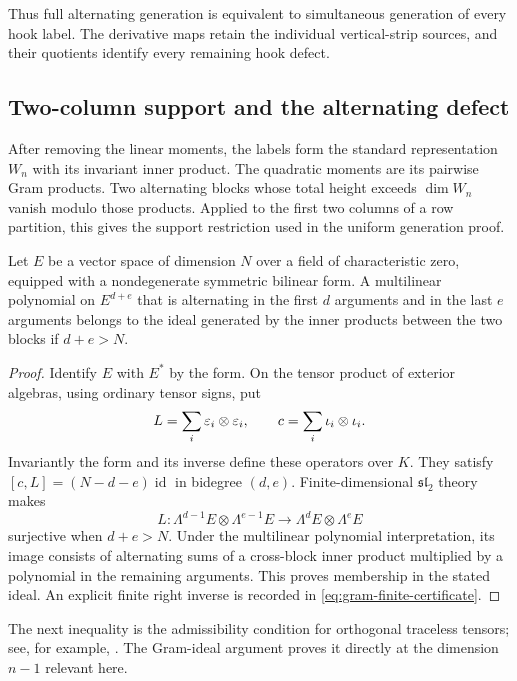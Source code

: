 Thus full alternating generation is equivalent to simultaneous
generation of every hook label. The derivative maps retain the
individual vertical-strip sources, and their quotients identify
every remaining hook defect.

\subsection{Two-column support and the alternating defect}
\label{sec:reconstruction}

After removing the linear moments, the labels form the standard
representation $W_n$ with its invariant inner product.  The
quadratic moments are its pairwise Gram products.  Two alternating
blocks whose total height exceeds $\dim W_n$ vanish modulo those
products.  Applied to the first two columns of a row partition,
this gives the support restriction used in the uniform generation proof.

\begin{lemma}
\label{lem:gram}
Let $E$ be a vector space of dimension $N$ over a
field of characteristic zero, equipped with a
nondegenerate symmetric bilinear form.
A multilinear polynomial on $E^{d+e}$ that is
alternating in the first $d$ arguments and in the
last $e$ arguments belongs to the ideal generated
by the inner products between the two blocks if $d+e>N$.
\end{lemma}

\begin{proof}
Identify $E$ with $E^*$ by the form. On the tensor product of exterior
algebras, using ordinary tensor signs, put
\[
 L=\sum_i\varepsilon_i\otimes\varepsilon_i,\qquad
 c=\sum_i\iota_i\otimes\iota_i.
\]
Invariantly the form and its inverse define these operators over $K$.
They satisfy $[c,L]=(N-d-e)\operatorname{id}$ in bidegree $(d,e)$.
Finite-dimensional $\mathfrak{sl}_2$ theory makes
\[
 L:\Lambda^{d-1}E\otimes\Lambda^{e-1}E
                 \longrightarrow\Lambda^dE\otimes\Lambda^eE
\]
surjective when $d+e>N$. Under the multilinear polynomial interpretation,
its image consists of alternating sums of a cross-block inner product
multiplied by a polynomial in the remaining arguments. This proves
membership in the stated ideal. An explicit finite right inverse is
recorded in \eqref{eq:gram-finite-certificate}.
\end{proof}

The next inequality is the admissibility condition for orthogonal
traceless tensors; see, for example, \cite{BGH}.  The Gram-ideal
argument proves it directly at the dimension $n-1$ relevant here.

